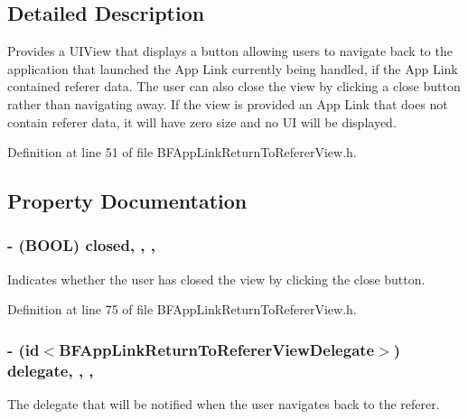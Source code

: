 \subsection{Detailed Description}
Provides a U\+I\+View that displays a button allowing users to navigate back to the application that launched the App Link currently being handled, if the App Link contained referer data. The user can also close the view by clicking a close button rather than navigating away. If the view is provided an App Link that does not contain referer data, it will have zero size and no U\+I will be displayed. 

Definition at line 51 of file B\+F\+App\+Link\+Return\+To\+Referer\+View.\+h.



\subsection{Property Documentation}
\hypertarget{interface_b_f_app_link_return_to_referer_view_acb041d67e8a2f626ae99a788aa8d1da4}{}
\subsubsection[{closed}]{\setlength{\rightskip}{0pt plus 5cm}-\/ (B\+O\+O\+L) closed\hspace{0.3cm}{\ttfamily [read]}, {\ttfamily [write]}, {\ttfamily [nonatomic]}, {\ttfamily [assign]}}\label{interface_b_f_app_link_return_to_referer_view_acb041d67e8a2f626ae99a788aa8d1da4}
Indicates whether the user has closed the view by clicking the close button. 

Definition at line 75 of file B\+F\+App\+Link\+Return\+To\+Referer\+View.\+h.

\hypertarget{interface_b_f_app_link_return_to_referer_view_aca2022c4be7763b7450d2a39df24b95a}{}
\subsubsection[{delegate}]{\setlength{\rightskip}{0pt plus 5cm}-\/ (id$<${\bf B\+F\+App\+Link\+Return\+To\+Referer\+View\+Delegate}$>$) delegate\hspace{0.3cm}{\ttfamily [read]}, {\ttfamily [write]}, {\ttfamily [nonatomic]}, {\ttfamily [weak]}}\label{interface_b_f_app_link_return_to_referer_view_aca2022c4be7763b7450d2a39df24b95a}
The delegate that will be notified when the user navigates back to the referer. 


